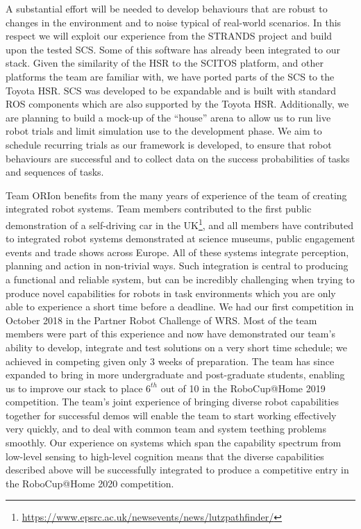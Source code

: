 \documentclass[runningheads,a4paper]{llncs}
\newcommand{\teamori}{Team ORIon}
\begin{document}
A substantial effort will be needed to develop behaviours that are robust to
changes in the environment and to noise typical of real-world scenarios. In this
respect we will exploit our experience from the STRANDS project 
\cite{strands@ram} and build upon the tested SCS. Some of this software has already been integrated to our stack.
Given the similarity of the HSR to the SCITOS platform, and other platforms the team are familiar with, %
we have ported parts of the
SCS to the Toyota HSR. SCS was developed to be 
expandable and is built with standard ROS components which are also supported 
by the Toyota HSR. 
Additionally, we are planning to build a mock-up of the ``house'' arena to
allow us to run live robot trials and limit simulation use to the development
phase. We aim to schedule recurring trials as our framework is developed, to
ensure that robot behaviours are successful and to collect data on the 
success probabilities of tasks and sequences of tasks.

\teamori{} benefits from the many years of experience of the team of creating integrated robot systems. Team members contributed to the first public demonstration of a self-driving car in the UK\footnote{\url{https://www.epsrc.ac.uk/newsevents/news/lutzpathfinder/}}, and all members have contributed to integrated robot systems demonstrated at science museums, public engagement events and trade shows across Europe. All of these systems integrate perception, planning and action in non-trivial ways. Such integration is central to producing a functional and reliable system, but can be incredibly challenging when trying to produce novel capabilities for robots in task environments which you are only able to experience a short time before a deadline. We had our
first competition in October 2018 in the Partner Robot Challenge of WRS. 
Most of the team members were part of this experience and now have demonstrated
our team's ability to develop, integrate and test solutions on a very short
time schedule; we achieved in competing given only 3 weeks of preparation. The team has since expanded to bring in more undergraduate and post-graduate students, enabling us to improve our stack to place $6^{th}$ out of 10 in the RoboCup@Home 2019 competition.
The team's joint experience of bringing diverse robot capabilities together for successful demos will enable the team to start working effectively very quickly, and to deal with common team and system teething problems smoothly. Our experience on systems which span the capability spectrum from low-level sensing to high-level cognition means that the diverse capabilities described above will be successfully integrated to produce a competitive entry in the RoboCup@Home 2020 competition.
\end{document}

